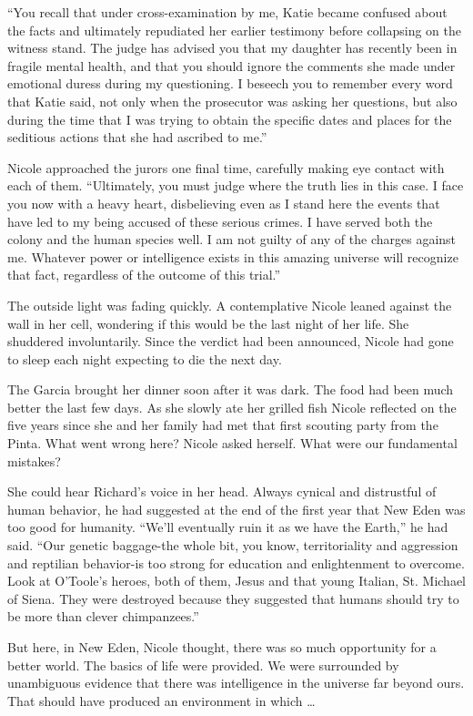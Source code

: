 \documentclass[]{article}
\begin{document}
{{“You recall that under cross-examination by me, Katie became confused about the facts and ultimately repudiated her earlier testimony before collapsing on the witness stand. The judge has advised you that my daughter has recently been in fragile mental health, and that you should ignore the comments she made under emotional duress during my questioning. I beseech you to remember every word that Katie said, not only when the prosecutor was asking her questions, but also during the time that I was trying to obtain the specific dates and places for the seditious actions that she had ascribed to me.”

Nicole approached the jurors one final time, carefully making eye contact with each of them. “Ultimately, you must judge where the truth lies in this case. I face you now with a heavy heart, disbelieving even as I stand here the events that have led to my being accused of these serious crimes. I have served both the colony and the human species well. I am not guilty of any of the charges against me. Whatever power or intelligence exists in this amazing universe will recognize that fact, regardless of the outcome of this trial.”

The outside light was fading quickly. A contemplative Nicole leaned against the wall in her cell, wondering if this would be the last night of her life. She shuddered involuntarily. Since the verdict had been announced, Nicole had gone to sleep each night expecting to die the next day.

The Garcia brought her dinner soon after it was dark. The food had been much better the last few days. As she slowly ate her grilled fish Nicole reflected on the five years since she and her family had met that first scouting party from the Pinta. What went wrong here? Nicole asked herself. What were our fundamental mistakes?

She could hear Richard’s voice in her head. Always cynical and distrustful of human behavior, he had suggested at the end of the first year that New Eden was too good for humanity. “We’ll eventually ruin it as we have the Earth,” he had said. “Our genetic baggage-the whole bit, you know, territoriality and aggression and reptilian behavior-is too strong for education and enlightenment to overcome. Look at O’Toole’s heroes, both of them, Jesus and that young Italian, St. Michael of Siena. They were destroyed because they suggested that humans should try to be more than clever chimpanzees.”

But here, in New Eden, Nicole thought, there was so much opportunity for a better world. The basics of life were provided. We were surrounded by unambiguous evidence that there was intelligence in the universe far beyond ours. That should have produced an environment in which …

}}
\end{document}
